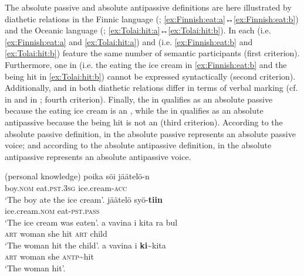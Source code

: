The absolute passive and absolute antipassive definitions are here illustrated by diathetic relations in the Finnic language  (; \ref{ex:Finnish:eat:a}↔\ref{ex:Finnish:eat:b}) and the Oceanic language  (; \ref{ex:Tolai:hit:a}↔\ref{ex:Tolai:hit:b}). In each   (i.e. \ref{ex:Finnish:eat:a} and \ref{ex:Tolai:hit:a}) and  (i.e. \ref{ex:Finnish:eat:b} and \ref{ex:Tolai:hit:b}) feature the same number of semantic participants (first criterion). Furthermore, one  in  (i.e. the  eating the ice cream in \ref{ex:Finnish:eat:b} and the  being hit in \ref{ex:Tolai:hit:b}) cannot be expressed syntactically (second criterion). Additionally,  and  in both diathetic relations differ in terms of verbal marking (cf.  in  and  in ; fourth criterion). Finally, the  in  qualifies as an absolute passive  because the  eating ice cream is an , while the  in  qualifies as an absolute antipassive  because the  being hit is not an  (third criterion). According to the absolute passive definition,  in the  absolute passive  represents an absolute passive voice; and according to the absolute antipassive definition,  in the  absolute antipassive  represents an absolute antipassive voice.

\ea {} (personal knowledge)
	\ea\label{ex:Finnish:eat:a}
	\gll	poika				söi						jäätelö-n				\\
			boy.\textsc{nom}	eat.\textsc{pst.3sg}	ice.cream-\textsc{acc}	\\
	\glt	‘The boy ate the ice cream’.
	\ex\label{ex:Finnish:eat:b}
	\gll	jäätelö					syö-\textbf{tiin}		\\
			ice.cream.\textsc{nom}	eat-\textsc{pst.pass}	\\
	\glt	‘The ice cream was eaten’.
	\z
\z
\ea {} \citep[248]{mosel:1991}
	\ea\label{ex:Tolai:hit:a}
	\gll	a				vavina	i	kita	ra				bul 	\\
			\textsc{art}	woman	she	hit		\textsc{art}	child	\\
	\glt	‘The woman hit the child’.
	\ex\label{ex:Tolai:hit:b}
	\gll	a				vavina	i	\textbf{ki}\~{}kita	\\
			\textsc{art}	woman	she	\textsc{antp}\~{}hit				\\
	\glt	‘The woman hit’.
	\z
\z

